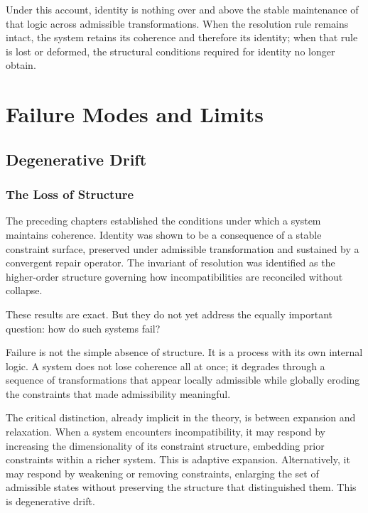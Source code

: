 \documentclass[11pt,openany]{book}
\begin{document}
Under this account, identity is nothing over and above the
stable maintenance of that logic across admissible
transformations.  When the resolution rule remains intact,
the system retains its coherence and therefore its
identity; when that rule is lost or deformed, the structural
conditions required for identity no longer obtain.

\part{Failure Modes and Limits}


\chapter{Degenerative Drift}
\label{ch:degenerative-drift}

\section*{ The Loss of Structure}

The preceding chapters established the conditions under
which a system maintains coherence.  Identity was shown to
be a consequence of a stable constraint surface, preserved
under admissible transformation and sustained by a
convergent repair operator.  The invariant of resolution
was identified as the higher-order structure governing how
incompatibilities are reconciled without collapse.

These results are exact.  But they do not yet address the
equally important question: how do such systems fail?

Failure is not the simple absence of structure.  It is a
process with its own internal logic.  A system does not
lose coherence all at once; it degrades through a sequence
of transformations that appear locally admissible while
globally eroding the constraints that made admissibility
meaningful.

The critical distinction, already implicit in the theory,
is between expansion and relaxation.  When a system
encounters incompatibility, it may respond by increasing
the dimensionality of its constraint structure, embedding
prior constraints within a richer system.  This is adaptive
expansion.  Alternatively, it may respond by weakening or
removing constraints, enlarging the set of admissible
states without preserving the structure that distinguished
them.  This is degenerative drift.
\end{document}
